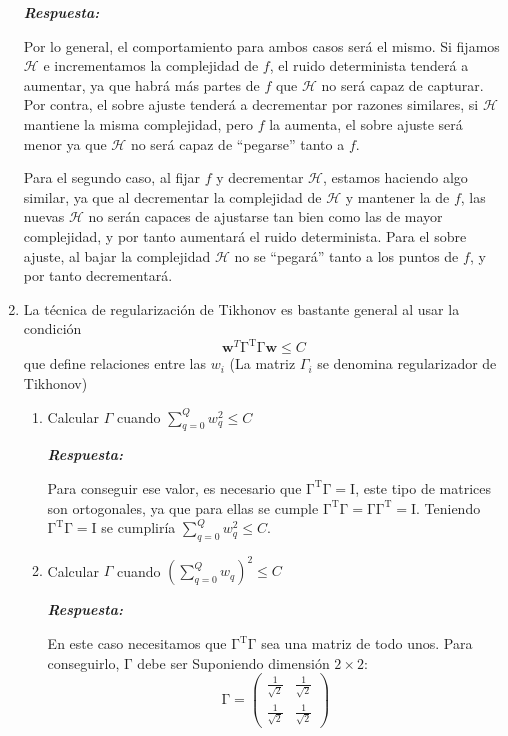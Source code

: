 \documentclass[  DIV=calc,%
paper=a4,%
fontsize=11pt]{scrartcl}             %
\newcommand{\miit}[1]{{\textbf{\textit{#1}}}}
\begin{document}
\begin{enumerate}
    \miit{Respuesta:}

    Por lo general, el comportamiento para ambos casos será el mismo. Si fijamos $\mathcal{H}$ e incrementamos la complejidad de $f$, el ruido
    determinista tenderá a aumentar,  ya que habrá más partes de $f$ que $\mathcal{H}$ no será capaz de capturar. Por contra, el sobre ajuste tenderá
    a decrementar por razones similares, si $\mathcal{H}$ mantiene la misma complejidad, pero $f$ la aumenta, el sobre ajuste será menor ya que
    $\mathcal{H}$ no será capaz de “pegarse” tanto a $f$.

    Para el segundo caso, al fijar $f$ y decrementar $\mathcal{H}$, estamos haciendo algo similar, ya que al decrementar la complejidad de
    $\mathcal{H}$ y mantener la de $f$, las nuevas $\mathcal{H}$ no serán capaces de ajustarse tan bien como las de mayor complejidad, y por tanto
    aumentará el ruido determinista. Para el sobre ajuste, al bajar la complejidad $\mathcal{H}$ no se “pegará” tanto a los puntos de $f$, y por tanto
    decrementará.

    \item La técnica de regularización de Tikhonov es bastante general al usar la condición
    \[
      \textbf{w}^T\mathrm{\Gamma^T\Gamma}\textbf{w}\leq C
    \]
    que define relaciones entre las $w_i$ (La matriz $\Gamma_i$ se denomina regularizador de Tikhonov)
    \begin{enumerate}
      \item Calcular $\Gamma$ cuando $\sum_{q=0}^Q w_q^2 \leq C$

      \miit{Respuesta:}

      Para conseguir ese valor, es necesario que $\mathrm{\Gamma^T\Gamma = I}$, este tipo de matrices son ortogonales, ya que para ellas se cumple
      $\mathrm{\Gamma^T\Gamma = \Gamma\Gamma^T = I}$. Teniendo $\mathrm{\Gamma^T\Gamma = I}$ se cumpliría $\sum_{q=0}^Q w_q^2 \leq C$.

      \item Calcular $\Gamma$ cuando $(\sum_{q=0}^Q w_q)^2 \leq C$

      \miit{Respuesta:}

      En este caso necesitamos que $\mathrm{\Gamma^T\Gamma}$ sea una matriz de todo unos. Para conseguirlo, $\mathrm{\Gamma}$ debe ser Suponiendo dimensión $2\times2$:
      \[
      \mathrm{\Gamma} =
        \begin{pmatrix}
          \frac{1}{\sqrt{2}} & \frac{1}{\sqrt{2}}\\
          \frac{1}{\sqrt{2}} & \frac{1}{\sqrt{2}}
        \end{pmatrix}
      \]


\end{enumerate}
\end{enumerate}
\end{document}
